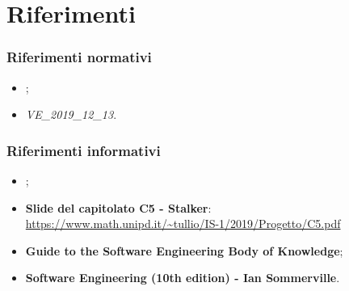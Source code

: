 \section{Riferimenti}

\subsubsection{Riferimenti normativi}
\begin{itemize}
\item {};
\item \textit{VE\_2019\_12\_13}.
\end{itemize}

\subsubsection{Riferimenti informativi}
\begin{itemize}
\item {};
\item \textbf{Slide del capitolato C5 - Stalker}: \\ \url{https://www.math.unipd.it/~tullio/IS-1/2019/Progetto/C5.pdf}
\item \textbf{Guide to the Software Engineering Body of Knowledge};
\item \textbf{Software Engineering (10th edition) - Ian Sommerville}.
\end{itemize}
